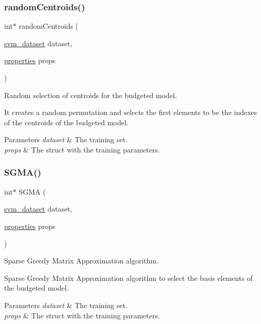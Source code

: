 \subsubsection{\texorpdfstring{random\+Centroids()}{randomCentroids()}}
{\ttfamily int$\ast$ random\+Centroids (\begin{DoxyParamCaption}\item[{\hyperlink{structsvm__dataset}{svm\+\_\+dataset}}]{dataset,  }\item[{\hyperlink{structproperties}{properties}}]{props }\end{DoxyParamCaption})}



Random selection of centroids for the budgeted model. 

It creates a random permutation and selects the first elements to be the indexes of the centroids of the budgeted model.


\begin{DoxyParams}{Parameters}
{\em dataset} & The training set. \\
\hline
{\em props} & The struct with the training parameters. \\
\hline
\end{DoxyParams}
\hypertarget{budgeted-train_8h_a50a6e1f36a010feb91db9b9b38679948}{}\label{budgeted-train_8h_a50a6e1f36a010feb91db9b9b38679948} 
\subsubsection{\texorpdfstring{S\+G\+M\+A()}{SGMA()}}
{\ttfamily int$\ast$ S\+G\+MA (\begin{DoxyParamCaption}\item[{\hyperlink{structsvm__dataset}{svm\+\_\+dataset}}]{dataset,  }\item[{\hyperlink{structproperties}{properties}}]{props }\end{DoxyParamCaption})}



Sparse Greedy Matrix Approximation algorithm. 

Sparse Greedy Matrix Approximation algorithm to select the basis elements of the budgeted model. 
\begin{DoxyParams}{Parameters}
{\em dataset} & The training set. \\
\hline
{\em props} & The struct with the training parameters. \\
\hline
\end{DoxyParams}
